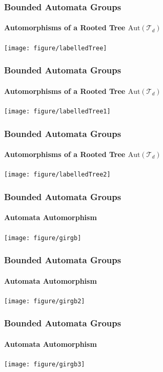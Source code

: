 \documentclass[11pt]{beamer}
\begin{document}



\begin{frame}
\frametitle{Bounded Automata Groups}
\framesubtitle{\large Automorphisms of a Rooted Tree $\mathrm{Aut}(\mathcal{T}_d)$}
\hspace{2em}\texttt{[image: figure/labelledTree]}
\end{frame}

\begin{frame}
\frametitle{Bounded Automata Groups}
\framesubtitle{\large Automorphisms of a Rooted Tree $\mathrm{Aut}(\mathcal{T}_d)$}
\hspace{2em}\texttt{[image: figure/labelledTree1]}
\end{frame}

\begin{frame}
\frametitle{Bounded Automata Groups}
\framesubtitle{\large Automorphisms of a Rooted Tree $\mathrm{Aut}(\mathcal{T}_d)$}
\hspace{2em}\texttt{[image: figure/labelledTree2]}
\end{frame}

\begin{frame}
\frametitle{Bounded Automata Groups}
\framesubtitle{\large Automata Automorphism}
\hspace{2em}\texttt{[image: figure/girgb]}
\end{frame}

\begin{frame}
\frametitle{Bounded Automata Groups}
\framesubtitle{\large Automata Automorphism}
\hspace{2em}\texttt{[image: figure/girgb2]}
\end{frame}


\begin{frame}
\frametitle{Bounded Automata Groups}
\framesubtitle{\large Automata Automorphism}
\hspace{2em}\texttt{[image: figure/girgb3]}
\end{frame}
\end{document}
